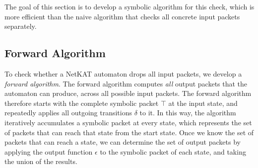 \documentclass[acmsmall,dvipsnames,nonacm]{acmart}
\begin{document}
The goal of this section is to develop a symbolic algorithm for this
check, which is more efficient than the naive algorithm that checks
all concrete input packets separately.

\subsection{Forward Algorithm}

To check whether a NetKAT automaton drops all input packets, we
develop a \emph{forward algorithm}.  The forward algorithm computes
\emph{all} output packets that the automaton can produce, across all
possible input packets.  The forward algorithm therefore starts with
the complete symbolic packet $\top$ at the input state, and repeatedly
applies all outgoing transitions $\delta$ to it.  In this way, the
algorithm iteratively accumulates a symbolic packet at every state,
which represents the set of packets that can reach that state from the
start state.  Once we know the set of packets that can reach a state,
we can determine the set of output packets by applying the output
function $\epsilon$ to the symbolic packet of each state, and taking
the union of the results.
\end{document}

